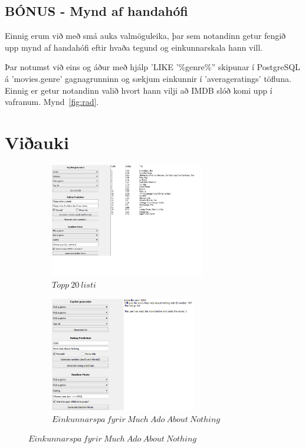 \documentclass[11pt,a4paper]{amsart}
\theoremstyle{plain}
\theoremstyle{definition}
\theoremstyle{remark}
\begin{document}
\subsection{BÓNUS - Mynd af handahófi}
Einnig erum við með smá auka valmöguleika, þar sem notandinn getur fengið upp mynd af handahófi eftir hvaða tegund og einkunnarskala hann vill.\par Þar notumst við eins og áður með hjálp 'LIKE '\%genre\%'' skipunar í PostgreSQL á 'movies.genre' gagnagrunninn og sækjum einkunnir í 'averageratings' töfluna.  Einnig er getur notandinn valið hvort hann vilji að IMDB slóð komi upp í vafranum. Mynd~\ref{fig:rad}.

\newpage

\section{Viðauki}
\vspace{2mm}
\begin{figure}[H]
	\centering
	\begin{subfigure}[H]{0.5\textwidth}
		\includegraphics[height=50mm]{ui_top20.jpg}
		\caption{$ Topp\ 20\ listi $\label{fig:top20}}
	\end{subfigure}
	\begin{subfigure}[H]{0.4\textwidth}
		\includegraphics[height=50mm]{predict.png}
		\caption{$ Einkunnarspa\ fyrir\ Much\ Ado\ About\ Nothing$\label{fig:predict}}	
	\end{subfigure}
\end{figure}
\vspace{2mm}
\end{document}
